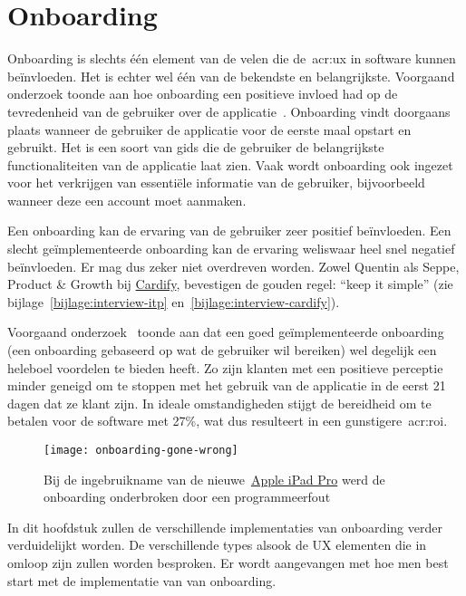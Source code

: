 \section{Onboarding}
\label{sec:onboarding}

Onboarding is slechts één element van de velen die de~\acrlong{acr:ux} in software kunnen beïnvloeden. Het is echter wel één van de bekendste en belangrijkste. Voorgaand onderzoek toonde aan hoe onboarding een positieve invloed had op de tevredenheid van de gebruiker over de applicatie~\autocite{Cardoso2017}. Onboarding vindt doorgaans plaats wanneer de gebruiker de applicatie voor de eerste maal opstart en gebruikt. Het is een soort van gids die de gebruiker de belangrijkste functionaliteiten van de applicatie laat zien. Vaak wordt onboarding ook ingezet voor het verkrijgen van essentiële informatie van de gebruiker, bijvoorbeeld wanneer deze een account moet aanmaken.

Een onboarding kan de ervaring van de gebruiker zeer positief beïnvloeden. Een slecht geïmplementeerde onboarding kan de ervaring weliswaar heel snel negatief beïnvloeden. Er mag dus zeker niet overdreven worden. Zowel Quentin als Seppe, Product \& Growth bij \href{https://getcardify.com/}{Cardify}, bevestigen de gouden regel: ``keep it simple'' (zie bijlage~\ref{bijlage:interview-itp} en~\ref{bijlage:interview-cardify}).

Voorgaand onderzoek~\autocite{Desai2019} toonde aan dat een goed geïmplementeerde onboarding (een onboarding gebaseerd op wat de gebruiker wil bereiken) wel degelijk een heleboel voordelen te bieden heeft. Zo zijn klanten met een positieve perceptie minder geneigd om te stoppen met het gebruik van de applicatie in de eerst 21 dagen dat ze klant zijn. In ideale omstandigheden stijgt de bereidheid om te betalen voor de software met 27\%, wat dus resulteert in een gunstigere~\acrfull{acr:roi}.

\begin{figure}
    \centering
    \texttt{[image: onboarding-gone-wrong]}
    \caption[Implementatiefout bij onboarding]{Bij de ingebruikname van de nieuwe~\href{https://www.apple.com/ipad-pro/}{Apple iPad Pro} werd de onboarding onderbroken door een programmeerfout}
    \label{fig:onboarding:fout}
\end{figure}

In dit hoofdstuk zullen de verschillende implementaties van onboarding verder verduidelijkt worden. De verschillende types alsook de UX elementen die in omloop zijn zullen worden besproken. Er wordt aangevangen met hoe men best start met de implementatie van van onboarding.

